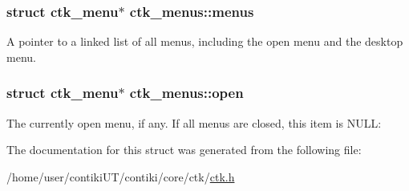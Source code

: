\subsubsection[{menus}]{\setlength{\rightskip}{0pt plus 5cm}struct {\bf ctk\+\_\+menu}$\ast$ ctk\+\_\+menus\+::menus}\label{structctk__menus_a3107c61dcb9ef9256a0a4052c4c21351}
A pointer to a linked list of all menus, including the open menu and the desktop menu. \hypertarget{structctk__menus_af155f1cd3f427f04670e20f6426d2de6}{}
\subsubsection[{open}]{\setlength{\rightskip}{0pt plus 5cm}struct {\bf ctk\+\_\+menu}$\ast$ ctk\+\_\+menus\+::open}\label{structctk__menus_af155f1cd3f427f04670e20f6426d2de6}
The currently open menu, if any. If all menus are closed, this item is N\+U\+L\+L\+: 

The documentation for this struct was generated from the following file\+:\begin{DoxyCompactItemize}
\item 
/home/user/contiki\+U\+T/contiki/core/ctk/\hyperlink{ctk_8h}{ctk.\+h}\end{DoxyCompactItemize}
